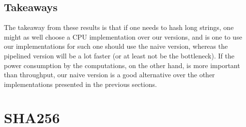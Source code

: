 \documentclass[a4paper, openany]{book}
\begin{document}
\begin{abstact}
\subsection{Takeaways}
\label{sec:org83d2f69}
The takeaway from these results is that if one needs to hash long strings, one might as well choose a CPU implementation over our versions, and is one to use our implementations for such one should use the naive version, whereas the pipelined version will be a lot faster (or at least not be the bottleneck). If the power consumption by the computations, on the other hand, is more important than throughput, our naive version is a good alternative over the other implementations presented in the previous sections.
\section{SHA256}
\label{sec:org49a56b8}
\label{sec:SHAperformance}

\end{abstact}
\end{document}
